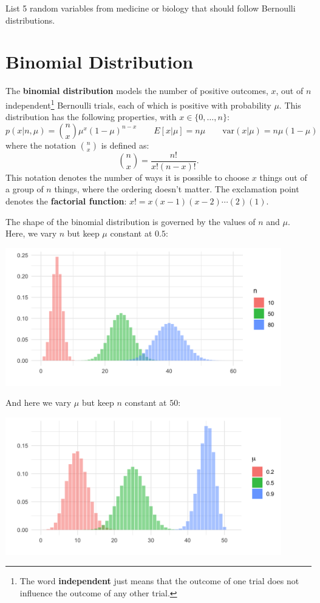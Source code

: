 \begin{question}{}
List 5 random variables from medicine or biology that should follow Bernoulli distributions.
\end{question}


\section{Binomial Distribution}

The \textbf{binomial distribution} models the number of positive outcomes, $x$, out of $n$ independent\footnote{The word \textbf{independent} just means that the outcome of one trial does not influence the outcome of any other trial.} Bernoulli trials, each of which is positive with probability $\mu$. This distribution has the following properties, with $x \in \{0, \dots, n\}$:
$$ p(x|n,\mu) = {n\choose x} \mu^x (1 - \mu) ^ {n-x} \qquad E[x| \mu] = n \mu \qquad \text{var}(x | \mu) = n \mu (1 - \mu) $$
where the notation ${n \choose x}$ is defined as:
$$ {n \choose x} = \frac{n!}{x!(n-x)!}. $$
This notation denotes the number of ways it is possible to choose $x$ things out of a group of $n$ things, where the ordering doesn't matter. The exclamation point denotes the \textbf{factorial function}: $x! = x(x-1)(x-2)\cdots(2)(1)$. 

The shape of the binomial distribution is governed by the values of $n$ and $\mu$. Here, we vary $n$ but keep $\mu$ constant at $0.5$:
\begin{center}
\includegraphics[width=0.9\textwidth]{img/l01-figure3-binom-n-change.png}
\end{center}
And here we vary $\mu$ but keep $n$ constant at $50$:
\begin{center}
\includegraphics[width=0.9\textwidth]{img/l01-figure4-binom-p-change.png}
\end{center}

